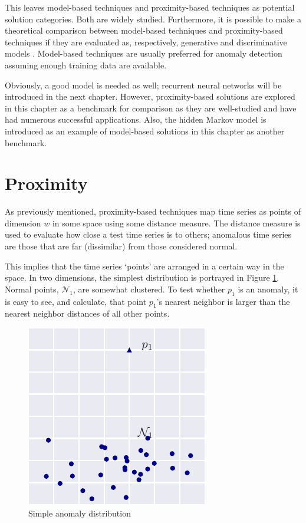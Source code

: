 This leaves model-based techniques and proximity-based techniques as potential solution categories. Both are widely studied. Furthermore, it is possible to make a theoretical comparison between model-based techniques and proximity-based techniques if they are evaluated as, respectively, generative and discriminative models \cite{Ng2006}. Model-based techniques are usually preferred for anomaly detection \cite{Ngkvist2014} assuming enough training data are available.

Obviously, a good model is needed as well; recurrent neural networks will be introduced in the next chapter. However, proximity-based solutions are explored in this chapter as a benchmark for comparison as they are well-studied and have had numerous successful applications. Also, the hidden Markov model is introduced as an example of model-based solutions in this chapter as another benchmark.


\section{Proximity}
\label{sec:adproximity}

As previously mentioned, proximity-based techniques map time series as points of dimension $w$ in some space using some distance measure. The distance measure is used to evaluate how close a test time series is to others; anomalous time series are those that are far (dissimilar) from those considered normal.

This implies that the time series `points' are arranged in a certain way in the space. In two dimensions, the simplest distribution is portrayed in Figure \ref{fig:simple_dist}. Normal points, $\mathcal{N}_1$, are somewhat clustered. To test whether $p_1$ is an anomaly, it is easy to see, and calculate, that point $p_1$'s nearest neighbor is larger than the nearest neighbor distances of all other points.

\begin{figure}[H]
  \centering
  \includegraphics{figs/simple_dist.pdf}
  \caption{Simple anomaly distribution}
  \label{fig:simple_dist}
\end{figure}

